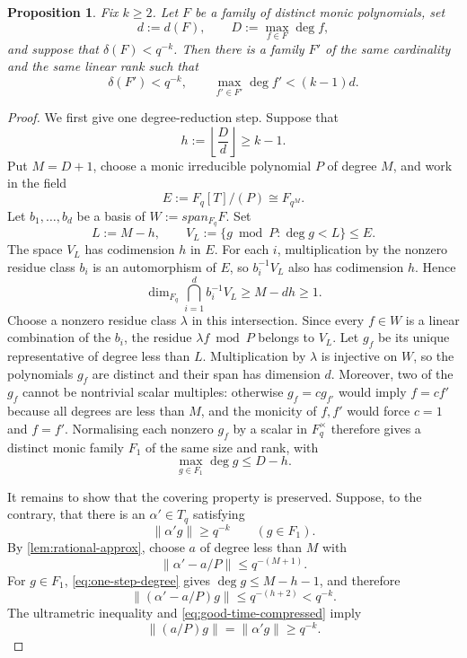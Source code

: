 \documentclass[10pt,a4paper]{amsart}
\newtheorem{proposition}{Proposition}
\newcommand{\Fq}{\mathbb F_q}
\newcommand{\Torus}{\mathbb T_q}
\newcommand{\cF}{\mathcal F}
\def\mathbb#1{#1}%
\def\mathcal#1{#1}%
\newcommand{\norm}[1]{\lVert#1\rVert}
\def\operatorname#1{#1}%
\newcommand{\set}[1]{\{#1\}}
\newcommand{\spanq}{\operatorname{span}_{\mathbb F_q}}
\begin{document}
\begin{proposition}\label{prop:compression}
Fix $k\ge2$.  Let $\cF$ be a family of distinct monic polynomials, set
\[
 d:=d(\cF),
 \qquad
 D:=\max_{f\in\cF}\deg f,
\]
and suppose that $\delta(\cF)<q^{-k}$.  Then there is a family $\cF'$ of the same cardinality and the same linear rank such that
\begin{equation}\label{eq:compression-conclusion}
 \delta(\cF')<q^{-k},
 \qquad
 \max_{f'\in\cF'}\deg f'<(k-1)d.
\end{equation}
\end{proposition}

\begin{proof}
We first give one degree-reduction step.  Suppose that
\begin{equation}\label{eq:h-compression}
 h:=\left\lfloor\frac Dd\right\rfloor\ge k-1.
\end{equation}
Put $M=D+1$, choose a monic irreducible polynomial $P$ of degree $M$, and work in the field
\[
 E:=\Fq[T]/(P)\cong\mathbb F_{q^M}.
\]
Let $b_1,\ldots,b_d$ be a basis of
$W:=\spanq\cF$.  Set
\[
 L:=M-h,
 \qquad
 V_L:=\set{g\bmod P:\deg g<L}\le E.
\]
The space $V_L$ has codimension $h$ in $E$.  For each $i$, multiplication by the nonzero residue class $b_i$ is an automorphism of $E$, so
$b_i^{-1}V_L$ also has codimension $h$.  Hence
\begin{equation}\label{eq:compression-intersection}
 \dim_{\Fq}\bigcap_{i=1}^db_i^{-1}V_L
 \ge M-dh\ge1.
\end{equation}
Choose a nonzero residue class $\lambda$ in this intersection.  Since every $f\in W$ is a linear combination of the $b_i$, the residue
$\lambda f\bmod P$ belongs to $V_L$.  Let $g_f$ be its unique representative of degree less than $L$.  Multiplication by $\lambda$ is injective on $W$, so the polynomials $g_f$ are distinct and their span has dimension $d$.  Moreover, two of the $g_f$ cannot be nontrivial scalar multiples: otherwise $g_f=cg_{f'}$ would imply $f=cf'$ because all degrees are less than $M$, and the monicity of $f,f'$ would force $c=1$ and $f=f'$.  Normalising each nonzero $g_f$ by a scalar in $\Fq^\times$ therefore gives a distinct monic family $\cF_1$ of the same size and rank, with
\begin{equation}\label{eq:one-step-degree}
 \max_{g\in\cF_1}\deg g\le D-h.
\end{equation}

It remains to show that the covering property is preserved.  Suppose, to the contrary, that there is an
$\alpha'\in\Torus$ satisfying
\begin{equation}\label{eq:good-time-compressed}
 \norm{\alpha'g}\ge q^{-k}
 \qquad(g\in\cF_1).
\end{equation}
By \cref{lem:rational-approx}, choose $a$ of degree less than $M$ with
\[
 \norm{\alpha'-a/P}\le q^{-(M+1)}.
\]
For $g\in\cF_1$, \eqref{eq:one-step-degree} gives
$\deg g\le M-h-1$, and therefore
\[
 \norm{(\alpha'-a/P)g}
 \le q^{-(h+2)}<q^{-k}.
\]
The ultrametric inequality and \eqref{eq:good-time-compressed} imply
\begin{equation}\label{eq:rational-time-good}
 \norm{(a/P)g}=\norm{\alpha'g}\ge q^{-k}.
\end{equation}


\end{proof}
\end{document}
